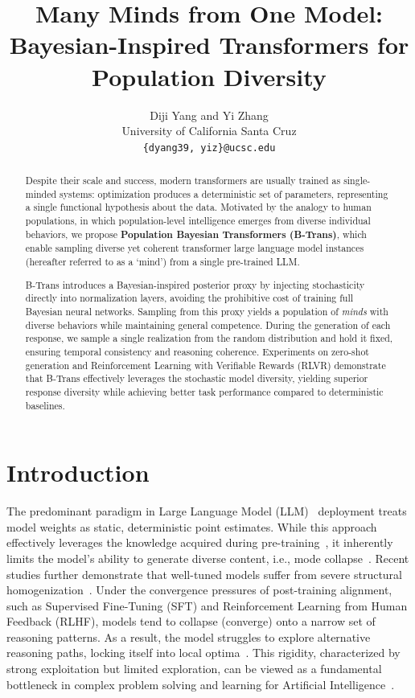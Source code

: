 \documentclass[11pt]{article}
\title{Many Minds from One Model: \\ Bayesian-Inspired Transformers for Population Diversity}
\author{Diji Yang and Yi Zhang\\
  University of California Santa Cruz \\
  \texttt{\{dyang39, yiz\}@ucsc.edu}}
\begin{document}
\maketitle
\begin{abstract}
Despite their scale and success, modern transformers are usually trained as single-minded systems: optimization produces a deterministic set of parameters, representing a single functional hypothesis about the data. Motivated by the analogy to human populations, in which population-level intelligence emerges from diverse individual behaviors, we propose \textbf{Population Bayesian Transformers (B-Trans)}, which enable sampling diverse yet coherent transformer large language model instances (hereafter referred to as a ‘mind’) from a single pre-trained LLM.

B-Trans introduces a Bayesian-inspired posterior proxy by injecting stochasticity directly into normalization layers, avoiding the prohibitive cost of training full Bayesian neural networks. Sampling from this proxy yields a population of \textit{minds} with diverse behaviors while maintaining general competence. During the generation of each response, we sample a single realization from the random distribution and hold it fixed, ensuring temporal consistency and reasoning coherence. Experiments on zero-shot generation and Reinforcement Learning with Verifiable Rewards (RLVR) demonstrate that B-Trans effectively leverages the stochastic model diversity, yielding superior response diversity while achieving better task performance compared to deterministic baselines.
\end{abstract}

\section{Introduction}
The predominant paradigm in Large Language Model (LLM)~\cite{yang2025qwen3,liu2025deepseek} deployment treats model weights as static, deterministic point estimates. While this approach effectively leverages the knowledge acquired during pre-training~\cite{wang2024mmlu}, it inherently limits the model's ability to generate diverse content, i.e., mode collapse~\cite{kirk2023understanding}. Recent studies further demonstrate that well-tuned models suffer from severe structural homogenization~\citep{jiang2025artificial}. Under the convergence pressures of post-training alignment, such as Supervised Fine-Tuning (SFT) and Reinforcement Learning from Human Feedback (RLHF), models tend to collapse (converge) onto a narrow set of reasoning patterns. As a result, the model struggles to explore alternative reasoning paths, locking itself into local optima~\cite{yue2025does}. This rigidity, characterized by strong exploitation but limited exploration, can be viewed as a fundamental bottleneck in complex problem solving and learning for Artificial Intelligence~\cite{sutton1998reinforcement}.
\end{document}
